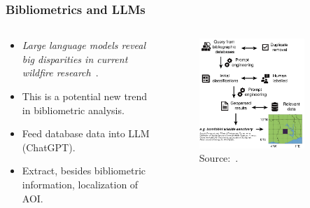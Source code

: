 \documentclass[aspectratio=169]{beamer}
\begin{document}
\begin{frame}
    \frametitle{Bibliometrics and LLMs}
    \begin{columns}
		\begin{column}{0.5\textwidth}
            \begin{itemize}
                \item \emph{Large language models reveal big disparities in 
                    current wildfire research}~\cite{lin2024}.
                \item This is a potential new trend in bibliometric analysis.
                \item Feed database data into LLM (ChatGPT).
                \item Extract, besides bibliometric information, localization
                    of AOI.
            \end{itemize}
        \end{column}
		\begin{column}{0.5\textwidth}
            \begin{figure}
                \centering
                \includegraphics[width=0.8\textwidth]
                {img/lin2024_workflow.png}
                \caption{Source:~\cite{lin2024}.}
            \end{figure}
        \end{column}
    \end{columns}
\end{frame}
\end{document}
